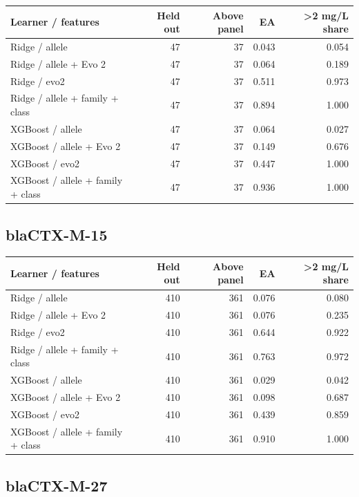\documentclass[
  10pt,
]{article}
\newcounter{none} %
\begin{document}
{\def\LTcaptype{none} %
\begin{longtable}[]{@{}lrrrr@{}}
\toprule\noalign{}
Learner / features & Held out & Above panel & EA & \textgreater2 mg/L
share \\
\midrule\noalign{}
\endhead
\bottomrule\noalign{}
\endlastfoot
Ridge / allele & 47 & 37 & 0.043 & 0.054 \\
Ridge / allele + Evo 2 & 47 & 37 & 0.064 & 0.189 \\
Ridge / evo2 & 47 & 37 & 0.511 & 0.973 \\
Ridge / allele + family + class & 47 & 37 & 0.894 & 1.000 \\
XGBoost / allele & 47 & 37 & 0.064 & 0.027 \\
XGBoost / allele + Evo 2 & 47 & 37 & 0.149 & 0.676 \\
XGBoost / evo2 & 47 & 37 & 0.447 & 1.000 \\
XGBoost / allele + family + class & 47 & 37 & 0.936 & 1.000 \\
\end{longtable}
}

\subsection{blaCTX-M-15}\label{blactx-m-15}

{\def\LTcaptype{none} %
\begin{longtable}[]{@{}lrrrr@{}}
\toprule\noalign{}
Learner / features & Held out & Above panel & EA & \textgreater2 mg/L
share \\
\midrule\noalign{}
\endhead
\bottomrule\noalign{}
\endlastfoot
Ridge / allele & 410 & 361 & 0.076 & 0.080 \\
Ridge / allele + Evo 2 & 410 & 361 & 0.076 & 0.235 \\
Ridge / evo2 & 410 & 361 & 0.644 & 0.922 \\
Ridge / allele + family + class & 410 & 361 & 0.763 & 0.972 \\
XGBoost / allele & 410 & 361 & 0.029 & 0.042 \\
XGBoost / allele + Evo 2 & 410 & 361 & 0.098 & 0.687 \\
XGBoost / evo2 & 410 & 361 & 0.439 & 0.859 \\
XGBoost / allele + family + class & 410 & 361 & 0.910 & 1.000 \\
\end{longtable}
}

\subsection{blaCTX-M-27}\label{blactx-m-27}
\end{document}
